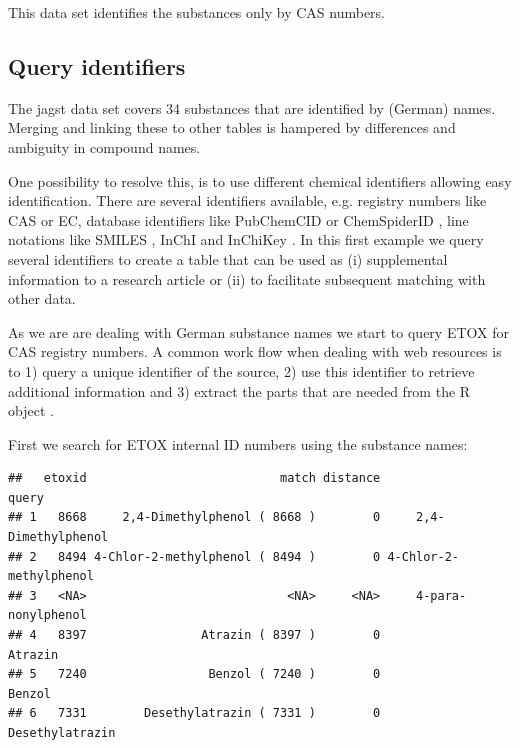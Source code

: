 This data set identifies the substances only by CAS numbers.


\subsection[Query identifiers]{Query identifiers}
The jagst data set covers 34 substances that are identified by (German) names.
Merging and linking these to other tables is hampered by differences and ambiguity in compound names.

One possibility to resolve this, is to use different chemical identifiers allowing easy identification.
There are several identifiers available, e.g.  registry numbers like CAS or EC, database identifiers like PubChemCID \citep{kim2016} or ChemSpiderID \citep{pence_chemspider:_2010}, line notations like SMILES \citep{Weininger_1990}, InChI and InChiKey \citep{Heller_McNaught_Pletnev_Stein_Tchekhovskoi_2015}. 
In this first example we query several identifiers to create a table that can be used as (i) supplemental information to a research article or (ii) to facilitate subsequent matching with other data.

As we are are dealing with German substance names we start to query ETOX for CAS registry numbers.
A common work flow when dealing with web resources is to 1) query a unique identifier of the source, 2) use this identifier to retrieve additional information and 3) extract the parts that are needed from the R object \citep{Chamberlain_Szocs_2013}.

First we search for ETOX internal ID numbers using the substance names:

\begin{knitrout}
\small
{}\color{fgcolor}\begin{kframe}
\begin{alltt}
 \hlkwb{<-} \hlopt{$}
 \hlkwb{<-}   \hlstd{=} \hlstd{)}
\end{alltt}
\begin{verbatim}
##   etoxid                           match distance                  query
## 1   8668     2,4-Dimethylphenol ( 8668 )        0     2,4-Dimethylphenol
## 2   8494 4-Chlor-2-methylphenol ( 8494 )        0 4-Chlor-2-methylphenol
## 3   <NA>                            <NA>     <NA>     4-para-nonylphenol
## 4   8397                Atrazin ( 8397 )        0                Atrazin
## 5   7240                 Benzol ( 7240 )        0                 Benzol
## 6   7331        Desethylatrazin ( 7331 )        0        Desethylatrazin
\end{verbatim}
\end{kframe}
\end{knitrout}

